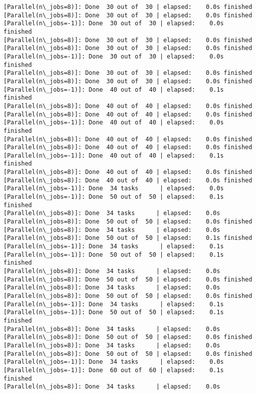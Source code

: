 \documentclass[11pt]{article}
\begin{document}
\begin{Verbatim}[commandchars=\\\{\}]
[Parallel(n\_jobs=8)]: Done  30 out of  30 | elapsed:    0.0s finished
[Parallel(n\_jobs=8)]: Done  30 out of  30 | elapsed:    0.0s finished
[Parallel(n\_jobs=-1)]: Done  30 out of  30 | elapsed:    0.0s finished
[Parallel(n\_jobs=8)]: Done  30 out of  30 | elapsed:    0.0s finished
[Parallel(n\_jobs=8)]: Done  30 out of  30 | elapsed:    0.0s finished
[Parallel(n\_jobs=-1)]: Done  30 out of  30 | elapsed:    0.0s finished
[Parallel(n\_jobs=8)]: Done  30 out of  30 | elapsed:    0.0s finished
[Parallel(n\_jobs=8)]: Done  30 out of  30 | elapsed:    0.0s finished
[Parallel(n\_jobs=-1)]: Done  40 out of  40 | elapsed:    0.1s finished
[Parallel(n\_jobs=8)]: Done  40 out of  40 | elapsed:    0.0s finished
[Parallel(n\_jobs=8)]: Done  40 out of  40 | elapsed:    0.0s finished
[Parallel(n\_jobs=-1)]: Done  40 out of  40 | elapsed:    0.0s finished
[Parallel(n\_jobs=8)]: Done  40 out of  40 | elapsed:    0.0s finished
[Parallel(n\_jobs=8)]: Done  40 out of  40 | elapsed:    0.0s finished
[Parallel(n\_jobs=-1)]: Done  40 out of  40 | elapsed:    0.1s finished
[Parallel(n\_jobs=8)]: Done  40 out of  40 | elapsed:    0.0s finished
[Parallel(n\_jobs=8)]: Done  40 out of  40 | elapsed:    0.0s finished
[Parallel(n\_jobs=-1)]: Done  34 tasks      | elapsed:    0.0s
[Parallel(n\_jobs=-1)]: Done  50 out of  50 | elapsed:    0.1s finished
[Parallel(n\_jobs=8)]: Done  34 tasks      | elapsed:    0.0s
[Parallel(n\_jobs=8)]: Done  50 out of  50 | elapsed:    0.0s finished
[Parallel(n\_jobs=8)]: Done  34 tasks      | elapsed:    0.0s
[Parallel(n\_jobs=8)]: Done  50 out of  50 | elapsed:    0.1s finished
[Parallel(n\_jobs=-1)]: Done  34 tasks      | elapsed:    0.1s
[Parallel(n\_jobs=-1)]: Done  50 out of  50 | elapsed:    0.1s finished
[Parallel(n\_jobs=8)]: Done  34 tasks      | elapsed:    0.0s
[Parallel(n\_jobs=8)]: Done  50 out of  50 | elapsed:    0.0s finished
[Parallel(n\_jobs=8)]: Done  34 tasks      | elapsed:    0.0s
[Parallel(n\_jobs=8)]: Done  50 out of  50 | elapsed:    0.0s finished
[Parallel(n\_jobs=-1)]: Done  34 tasks      | elapsed:    0.1s
[Parallel(n\_jobs=-1)]: Done  50 out of  50 | elapsed:    0.1s finished
[Parallel(n\_jobs=8)]: Done  34 tasks      | elapsed:    0.0s
[Parallel(n\_jobs=8)]: Done  50 out of  50 | elapsed:    0.0s finished
[Parallel(n\_jobs=8)]: Done  34 tasks      | elapsed:    0.0s
[Parallel(n\_jobs=8)]: Done  50 out of  50 | elapsed:    0.0s finished
[Parallel(n\_jobs=-1)]: Done  34 tasks      | elapsed:    0.0s
[Parallel(n\_jobs=-1)]: Done  60 out of  60 | elapsed:    0.1s finished
[Parallel(n\_jobs=8)]: Done  34 tasks      | elapsed:    0.0s

\end{Verbatim}
\end{document}

